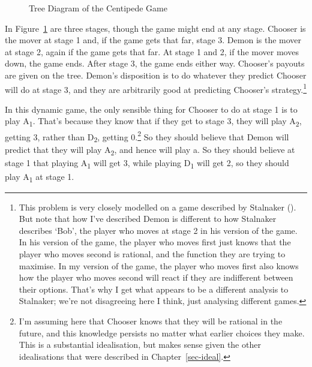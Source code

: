 \documentclass[
  12pt,
  letterpaper,
  DIV=11,
  numbers=noendperiod]{scrreprt}
\begin{document}
\begin{figure}


\caption{\label{fig-stalnaker-centipede}Tree Diagram of the Centipede
Game}

\end{figure}%

In Figure~\ref{fig-stalnaker-centipede} are three stages, though the
game might end at any stage. Chooser is the mover at stage 1 and, if the
game gets that far, stage 3. Demon is the mover at stage 2, again if the
game gets that far. At stage 1 and 2, if the mover moves down, the game
ends. After stage 3, the game ends either way. Chooser's payouts are
given on the tree. Demon's disposition is to do whatever they predict
Chooser will do at stage 3, and they are arbitrarily good at predicting
Chooser's strategy.\footnote{This problem is very closely modelled on a
  game described by Stalnaker ().
  But note that how I've described Demon is different to how Stalnaker
  describes `Bob', the player who moves at stage 2 in his version of the
  game. In his version of the game, the player who moves first just
  knows that the player who moves second is rational, and the function
  they are trying to maximise. In my version of the game, the player who
  moves first also knows how the player who moves second will react if
  they are indifferent between their options. That's why I get what
  appears to be a different analysis to Stalnaker; we're not disagreeing
  here I think, just analysing different games.}

In this dynamic game, the only sensible thing for Chooser to do at stage
1 is to play A\textsubscript{1}. That's because they know that if they
get to stage 3, they will play A\textsubscript{2}, getting 3, rather
than D\textsubscript{2}, getting 0.\footnote{I'm assuming here that
  Chooser knows that they will be rational in the future, and this
  knowledge persists no matter what earlier choices they make. This is a
  substantial idealisation, but makes sense given the other
  idealisations that were described in Chapter~\ref{sec-ideal}.} So they
should believe that Demon will predict that they will play
A\textsubscript{2}, and hence will play a. So they should believe at
stage 1 that playing A\textsubscript{1} will get 3, while playing
D\textsubscript{1} will get 2, so they should play A\textsubscript{1} at
stage 1.
\end{document}

